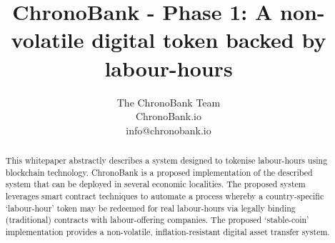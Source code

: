 



\title{ChronoBank - Phase 1: A non-volatile digital token backed by labour-hours}

\author{The ChronoBank Team \\
ChronoBank.io \\
info@chronobank.io
}


\begin{abstract} \small
This whitepaper abstractly describes a system designed to tokenise labour-hours using blockchain technology. ChronoBank is a proposed implementation of the described system that can be deployed in several economic localities. The proposed system leverages smart contract techniques to automate a process whereby a country-specific `labour-hour' token may be redeemed for real labour-hours via legally binding (traditional) contracts with labour-offering companies. The proposed `stable-coin' implementation provides a non-volatile, inflation-resistant digital asset transfer system.
\end{abstract}

\maketitle

